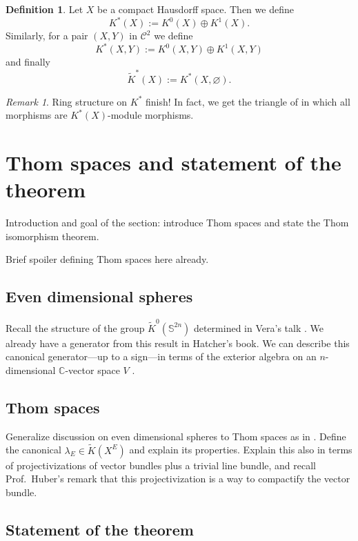 \documentclass[12pt,a4paper]{amsart}
\theoremstyle{plain}
\theoremstyle{definition}
\newtheorem{defn}[thm]{Definition}
\theoremstyle{remark}
\newtheorem{rem}[thm]{Remark}
\begin{document}
\begin{defn}
  Let $X$ be a compact Hausdorff space.
  Then we define
  \[ K^{*}(X) := K^{0}(X) \oplus K^{1}(X). \]
  Similarly, for a pair $(X,Y)$ in $\mathcal{C}^{2}$ we define
  \[ K^{*}(X,Y) := K^{0}(X,Y) \oplus K^{1}(X,Y) \]
  and finally
  \[ \tilde{K}^{*}(X) := K^{*}(X,\varnothing). \]
\end{defn}

\begin{rem}
  Ring structure on $K^{*}$ \color{red} finish! \color{black}
  In fact, we get the triangle of \cite[p.~87]{ati67} in which all morphisms are $K^{*}(X)$-module morphisms.
\end{rem}

\section{Thom spaces and statement of the theorem}

Introduction and goal of the section: introduce Thom spaces and state the Thom isomorphism theorem.

Brief spoiler defining Thom spaces here already.

\subsection{Even dimensional spheres}

Recall the structure of the group $\tilde{K}^{0}(\mathbb{S}^{2n})$ determined in Vera's talk \cite[Corollary 2.12]{hat03}.
We already have a generator from this result in Hatcher's book.
We can describe this canonical generator---up to a sign---in terms of the exterior algebra on an $n$-dimensional $\mathbb{C}$-vector space $V$ \cite[p.~99]{ati67}.

\subsection{Thom spaces}

Generalize discussion on even dimensional spheres to Thom spaces as in \cite[p.~100]{ati67}.
Define the canonical $\lambda_{E} \in \tilde{K}(X^{E})$ and explain its properties.
Explain this also in terms of projectivizations of vector bundles plus a trivial line bundle, and recall Prof.~Huber's remark that this projectivization is a way to compactify the vector bundle.

\subsection{Statement of the theorem}
\end{document}
